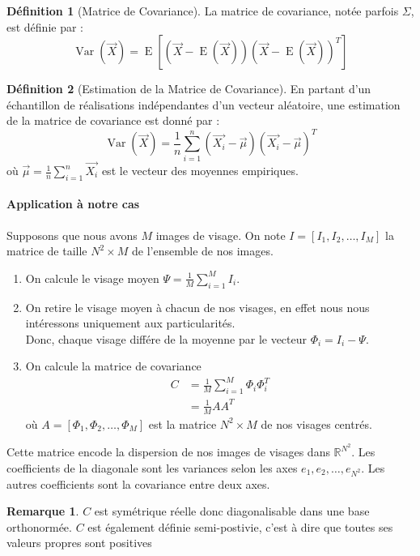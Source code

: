 \documentclass[12pt,french]{article}
\theoremstyle{plain}
\theoremstyle{definition}
\newtheorem{defi}{Définition}
\newtheorem{rmq}{Remarque}
\DeclareMathOperator\Var{Var}
\DeclareMathOperator\esp{E}
\begin{document}
\begin{defi}[Matrice de Covariance]
  La matrice de covariance, notée parfois $\Sigma$, est définie par :
  \[
    \Var(\overrightarrow{X}) = \esp[(\overrightarrow{X}-\esp(\overrightarrow{X})) (\overrightarrow{X}-\esp(\overrightarrow{X}))^T]
  \]
\end{defi}

\begin{defi}[Estimation de la Matrice de Covariance]
  En partant d’un échantillon de réalisations indépendantes d’un vecteur aléatoire, une estimation de la matrice de covariance est donné par :
  \[
    \Var(\overrightarrow{X}) = \frac{1}{n} \displaystyle\sum_{i=1}^{n} (\overrightarrow{X_i} - \overrightarrow{\mu})(\overrightarrow{X_i}-\overrightarrow{\mu})^T
  \]
  où $\overrightarrow{\mu} = \frac{1}{n} \displaystyle\sum_{i=1}^{n}\overrightarrow{X_i}$ est le vecteur des moyennes empiriques.
\end{defi}

\paragraph{Application à notre cas}
Supposons que nous avons $M$ images de visage. On note $I = [I_1, I_2, \dotsc, I_M]$ la matrice de taille $N^2 \times M$ de l'ensemble de nos images.
\begin{enumerate}
\item On calcule le visage moyen $\Psi = \frac{1}{M}\displaystyle\sum_{i=1}^{M} I_i$.
\item On retire le visage moyen à chacun de nos visages, en effet nous nous intéressons uniquement aux particularités.\\
  Donc, chaque visage différe de la moyenne par le vecteur $\Phi_i = I_i - \Psi$.
\item On calcule la matrice de covariance
  \begin{align*}
    C &= \frac{1}{M} \displaystyle\sum_{i=1}^{M} \Phi_i \Phi_i^T \\
      &= \frac{1}{M} AA^T
  \end{align*}
  où $A = [\Phi_1,\Phi_2,\dotsc,\Phi_M]$ est la matrice $N^2 \times M$ de nos visages centrés.
\end{enumerate}
Cette matrice encode la dispersion de nos images de visages dans $\mathbb{R}^{N^2}$. Les coefficients de la diagonale sont les variances selon les axes $e_1, e_2, \dots, e_{N^2}$.
Les autres coefficients sont la covariance entre deux axes.

\begin{rmq}
  $C$ est symétrique réelle donc diagonalisable dans une base orthonormée. $C$ est également définie semi-postivie, c'est à dire que toutes ses valeurs propres sont positives
\end{rmq}
\end{document}
